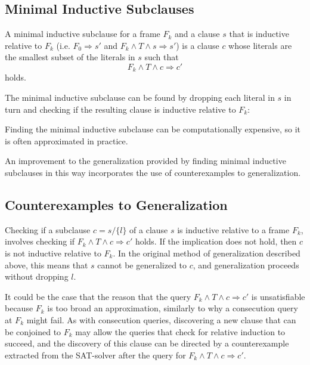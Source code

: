 \documentclass[12pt,a4paper,twoside,openright]{report}
\begin{document}
\subsection{Minimal Inductive Subclauses}
A minimal inductive subclause for a frame $F_k$ and a clause $s$ that
is inductive relative to $F_k$
(i.e. $F_0 \Rightarrow s'$ and $F_k \wedge T \wedge s \Rightarrow s'$)
is a clause $c$ whose
literals are the smallest subset of the literals in $s$ such that
$$F_k \wedge T \wedge c \Rightarrow c'$$
holds.

The minimal inductive subclause can be found by dropping each literal
in $s$ in turn and checking if the resulting clause is inductive
relative to $F_k$:

\begin{algorithm}[H]
\DontPrintSemicolon
{}
\end{algorithm}

Finding the minimal inductive subclause can be computationally
expensive, so it is often approximated in practice.

An improvement to the generalization provided by finding minimal
inductive subclauses in this way incorporates the use of counterexamples
to generalization.

\subsection{Counterexamples to Generalization}

Checking if a subclause $c = s / \{l\}$ of a clause $s$ is inductive
relative to a frame $F_k$, involves checking if
$F_k \wedge T \wedge c \Rightarrow c'$ holds.
If the implication does not hold, then $c$ is not inductive relative to
$F_k$. In the original method of generalization described above,
this means that $s$ cannot be generalized to $c$, and generalization
proceeds without dropping $l$.

It could be the case that the reason that the query
$F_k \wedge T \wedge c \Rightarrow c'$ is unsatisfiable because
$F_k$ is too broad an approximation, similarly to why a consecution
query at $F_k$ might fail. As with consecution queries, discovering a
new clause that can be conjoined to $F_k$ may allow the queries that
check for relative induction to succeed, and the discovery of this
clause can be directed by a counterexample extracted from the
SAT-solver after the query for $F_k \wedge T \wedge c \Rightarrow c'$.
\end{document}
